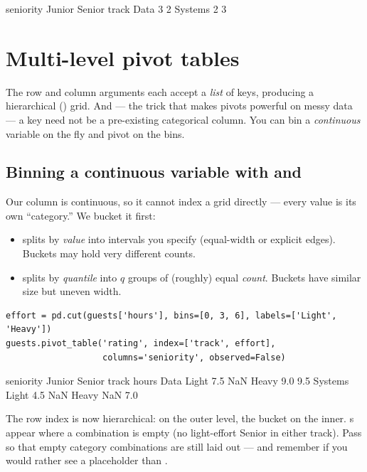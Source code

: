 \documentclass[11pt]{article}
\begin{document}
\begin{outblock}
seniority   Junior  Senior
track
Data             3       2
Systems          2       3
\end{outblock}

\section{Multi-level pivot tables}

The row and column arguments each accept a \emph{list} of keys, producing a hierarchical () grid. And --- the trick that makes pivots powerful on messy data --- a key need not be a pre-existing categorical column. You can bin a \emph{continuous} variable on the fly and pivot on the bins.

\subsection{Binning a continuous variable with  and }

Our  column is continuous, so it cannot index a grid directly --- every value is its own ``category.'' We bucket it first:

\begin{itemize}
  \item {} splits by \emph{value} into intervals you specify (equal-width or explicit edges). Buckets may hold very different counts.
  \item {} splits by \emph{quantile} into $q$ groups of (roughly) equal \emph{count}. Buckets have similar size but uneven width.
\end{itemize}

\begin{lstlisting}
effort = pd.cut(guests['hours'], bins=[0, 3, 6], labels=['Light', 'Heavy'])
guests.pivot_table('rating', index=['track', effort],
                   columns='seniority', observed=False)
\end{lstlisting}

\begin{outblock}
                  seniority  Junior  Senior
track   hours
Data    Light                   7.5     NaN
        Heavy                   9.0     9.5
Systems Light                   4.5     NaN
        Heavy                   NaN     7.0
\end{outblock}

The row index is now hierarchical:  on the outer level, the  bucket on the inner. s appear where a combination is empty (no light-effort Senior in either track). Pass  so that empty category combinations are still laid out --- and remember  if you would rather see a placeholder than .
\end{document}
